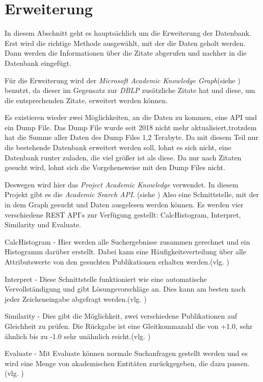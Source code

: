 \newpage
\section{Erweiterung}




In diesem Abschnitt geht es hauptsächlich um die Erweiterung der Datenbank. Erst wird die richtige Methode ausgewählt, mit der die Daten geholt werden. Dann werden die Informationen über die Zitate abgerufen und nachher in die Datenbank eingefügt.

Für die Erweiterung wird der \textit{Microsoft Academic Knowledge Graph}(siehe \cite{DBLP:conf/semweb/Farber19}) benutzt, da dieser im Gegensatz zur \textit{DBLP} zusätzliche Zitate hat und diese, um die entsprechenden Zitate, erweitert werden können.

Es existieren wieder zwei Möglichkeiten, an die Daten zu kommen, eine API und ein Dump File. Das Dump File wurde seit 2018 nicht mehr aktualisiert,trotzdem hat die Summe aller Daten des Dump Files 1,2 Terabyte. Da mit diesem Teil nur die bestehende Datenbank erweitert werden soll, lohnt es sich nicht, eine Datenbank runter zuladen, die viel größer ist als diese. Da nur nach Zitaten gesucht wird, lohnt sich die Vorgehensweise mit den Dump Files nicht. 

Deswegen wird hier das \textit{Project Academic Knowledge} verwendet. In diesem Projekt gibt es die \textit{Academic Search API}. (siehe \cite{PAK} ) Also eine Schnittstelle, mit der in dem Graph gesucht und Daten ausgelesen werden können. Es werden vier verschiedene REST API’s zur Verfügung gestellt: CalcHistogram, Interpret, Similarity und Evaluate.



CalcHistogram - Hier werden alle Suchergebnisse zusammen gerechnet und ein Histogramm darüber erstellt. Dabei kann eine Häufigkeitsverteilung über alle Attributswerte von den gesuchten Publikationen erhalten werden.(vlg. \cite{PAKAPI})

Interpret - Diese Schnittstelle funktioniert wie eine automatische Vervollständigung und gibt Lösungsvorschläge an. Dies kann am besten nach jeder Zeicheneingabe abgefragt werden.(vlg. \cite{PAKAPI})

Similarity - Dies gibt die Möglichkeit, zwei verschiedene Publikationen auf Gleichheit zu prüfen. Die Rückgabe ist eine Gleitkommazahl die von +1.0, sehr ähnlich bis zu -1.0 sehr unähnlich reicht.(vlg. \cite{PAKAPI})

Evaluate - Mit Evaluate können normale Suchanfragen gestellt werden und es wird eine Menge von akademischen Entitäten zurückgegeben, die dazu passen.(vlg. \cite{PAKAPI})


